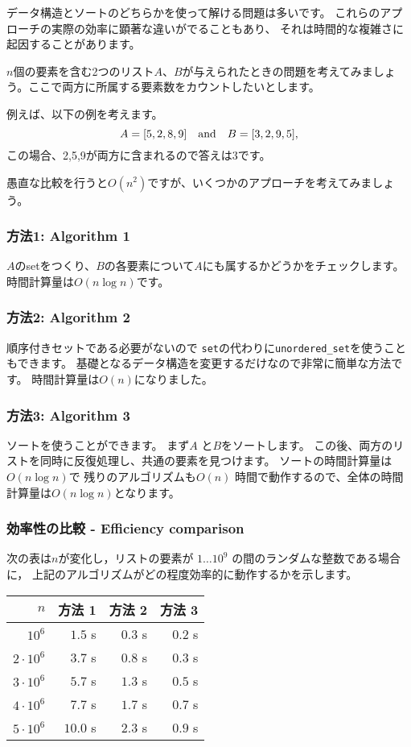 データ構造とソートのどちらかを使って解ける問題は多いです。
これらのアプローチの実際の効率に顕著な違いがでることもあり、
それは時間的な複雑さに起因することがあります。

$n$個の要素を含む2つのリスト$A$、$B$が与えられたときの問題を考えてみましょう。ここで両方に所属する要素数をカウントしたいとします。

例えば、以下の例を考えます。
\[A = [5,2,8,9] \hspace{10px} \textrm{and} \hspace{10px} B = [3,2,9,5],\]
この場合、2,5,9が両方に含まれるので答えは3です。

愚直な比較を行うと$O(n^2)$ですが、いくつかのアプローチを考えてみましょう。

\subsubsection{方法1: Algorithm 1}

$A$のsetをつくり、$B$の各要素について$A$にも属するかどうかをチェックします。
時間計算量は$O(n \log n)$です。

\subsubsection{方法2: Algorithm 2}

順序付きセットである必要がないので
\texttt{set}の代わりに\texttt{unordered\_set}を使うこともできます。
基礎となるデータ構造を変更するだけなので非常に簡単な方法です。
時間計算量は$O(n)$になりました。

\subsubsection{方法3: Algorithm 3}

ソートを使うことができます。
まず$A$ と$B$をソートします。
この後、両方のリストを同時に反復処理し、共通の要素を見つけます。
ソートの時間計算量は$O(n \log n)$で
残りのアルゴリズムも$O(n)$ 時間で動作するので、全体の時間計算量は$O(n \log n)$となります。

\subsubsection{効率性の比較 - Efficiency comparison}

次の表は$n$が変化し，リストの要素が $1 \ldots 10^9$ の間のランダムな整数である場合に，
上記のアルゴリズムがどの程度効率的に動作するかを示します。
\begin{center}
\begin{tabular}{rrrr}
$n$ & 方法 1 & 方法 2 & 方法 3 \\
\hline
$10^6$ & $1.5$ s & $0.3$ s & $0.2$ s \\
$2 \cdot 10^6$ & $3.7$ s & $0.8$ s & $0.3$ s \\
$3 \cdot 10^6$ & $5.7$ s & $1.3$ s & $0.5$ s \\
$4 \cdot 10^6$ & $7.7$ s & $1.7$ s & $0.7$ s \\
$5 \cdot 10^6$ & $10.0$ s & $2.3$ s & $0.9$ s \\
\end{tabular}
\end{center}

